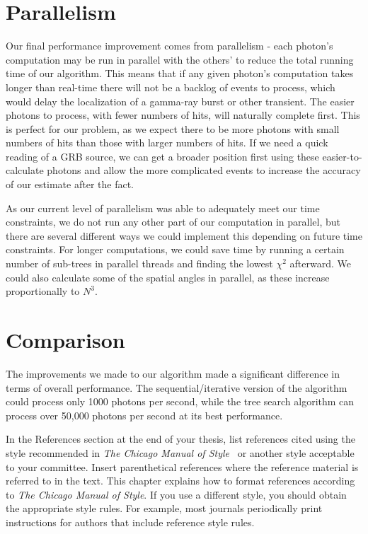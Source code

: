 \section{Parallelism}
Our final performance improvement comes from parallelism - each photon's computation may be run in parallel with the others' to reduce the total running time of our algorithm. This means that if any given photon's computation takes longer than real-time there will not be a backlog of events to process, which would delay the localization of a gamma-ray burst or other transient. The easier photons to process, with fewer numbers of hits, will naturally complete first. This is perfect for our problem, as we expect there to be more photons with small numbers of hits than those with larger numbers of hits. If we need a quick reading of a GRB source, we can get a broader position first using these easier-to-calculate photons and allow the more complicated events to increase the accuracy of our estimate after the fact.

As our current level of parallelism was able to adequately meet our time constraints, we do not run any other part of our computation in parallel, but there are several different ways we could implement this depending on future time constraints. For longer computations, we could save time by running a certain number of sub-trees in parallel threads and finding the lowest $\chi^2$ afterward. We could also calculate some of the spatial angles in parallel, as these increase proportionally to $N^3$.

\section{Comparison}

The improvements we made to our algorithm made a significant difference in terms of overall performance. The sequential/iterative version of the algorithm could process only 1000 photons per second, while the tree search algorithm can process over 50,000 photons per second at its best performance.

\iffalse
\label{cpt:citation}

In the References section at the end of your thesis, list references cited
using the style recommended in \textit{The Chicago Manual of
Style}~\cite{ChicagoManual} or another style acceptable to your committee.
Insert parenthetical references where the reference material is referred to in
the text.  This chapter explains how to format references according to
\textit{The Chicago Manual of Style}.  If you use a different style, you should
obtain the appropriate style rules.  For example, most journals periodically
print instructions for authors that include reference style rules.

